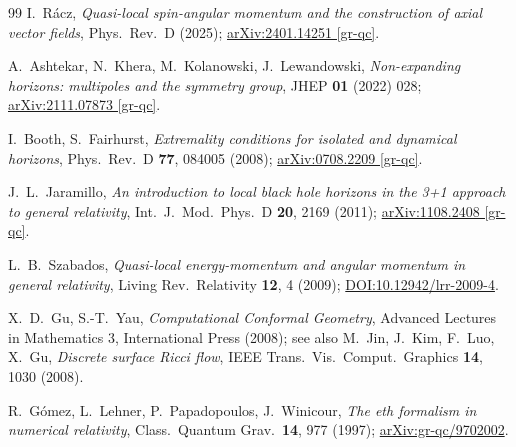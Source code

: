 \documentclass[11pt]{article}
\begin{document}
\begin{thebibliography}{99}
I.~R\'acz,
\emph{Quasi-local spin-angular momentum and the construction of axial
vector fields},
Phys.\ Rev.\ D (2025);
\href{https://arxiv.org/abs/2401.14251}{arXiv:2401.14251 [gr-qc]}.

A.~Ashtekar, N.~Khera, M.~Kolanowski, J.~Lewandowski,
\emph{Non-expanding horizons: multipoles and the symmetry group},
JHEP \textbf{01} (2022) 028;
\href{https://arxiv.org/abs/2111.07873}{arXiv:2111.07873 [gr-qc]}.

I.~Booth, S.~Fairhurst,
\emph{Extremality conditions for isolated and dynamical horizons},
Phys.\ Rev.\ D \textbf{77}, 084005 (2008);
\href{https://arxiv.org/abs/0708.2209}{arXiv:0708.2209 [gr-qc]}.

J.~L.~Jaramillo,
\emph{An introduction to local black hole horizons in the 3+1 approach to
general relativity},
Int.\ J.\ Mod.\ Phys.\ D \textbf{20}, 2169 (2011);
\href{https://arxiv.org/abs/1108.2408}{arXiv:1108.2408 [gr-qc]}.

L.~B.~Szabados,
\emph{Quasi-local energy-momentum and angular momentum in general
relativity},
Living Rev.\ Relativity \textbf{12}, 4 (2009);
\href{https://doi.org/10.12942/lrr-2009-4}{DOI:10.12942/lrr-2009-4}.

X.~D.~Gu, S.-T.~Yau,
\emph{Computational Conformal Geometry},
Advanced Lectures in Mathematics 3, International Press (2008);
see also M.~Jin, J.~Kim, F.~Luo, X.~Gu,
\emph{Discrete surface Ricci flow},
IEEE Trans.\ Vis.\ Comput.\ Graphics \textbf{14}, 1030 (2008).

R.~G\'omez, L.~Lehner, P.~Papadopoulos, J.~Winicour,
\emph{The eth formalism in numerical relativity},
Class.\ Quantum Grav.\ \textbf{14}, 977 (1997);
\href{https://arxiv.org/abs/gr-qc/9702002}{arXiv:gr-qc/9702002}.

\end{thebibliography}
\end{document}
